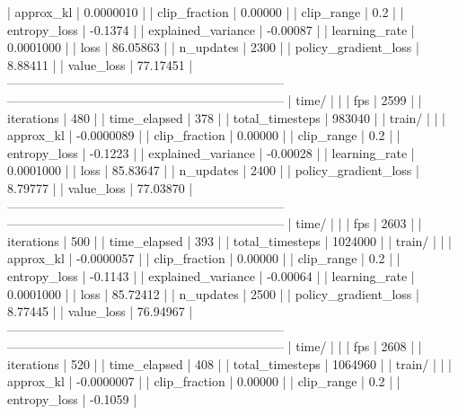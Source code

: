 |    approx_kl            |    0.0000010 |
|    clip_fraction        |      0.00000 |
|    clip_range           |          0.2 |
|    entropy_loss         |      -0.1374 |
|    explained_variance   |     -0.00087 |
|    learning_rate        |    0.0001000 |
|    loss                 |     86.05863 |
|    n_updates            |         2300 |
|    policy_gradient_loss |      8.88411 |
|    value_loss           |     77.17451 |
------------------------------------------------------------------
------------------------------------------------------------------
| time/                   |              |
|    fps                  |         2599 |
|    iterations           |          480 |
|    time_elapsed         |          378 |
|    total_timesteps      |       983040 |
| train/                  |              |
|    approx_kl            |   -0.0000089 |
|    clip_fraction        |      0.00000 |
|    clip_range           |          0.2 |
|    entropy_loss         |      -0.1223 |
|    explained_variance   |     -0.00028 |
|    learning_rate        |    0.0001000 |
|    loss                 |     85.83647 |
|    n_updates            |         2400 |
|    policy_gradient_loss |      8.79777 |
|    value_loss           |     77.03870 |
------------------------------------------------------------------
------------------------------------------------------------------
| time/                   |              |
|    fps                  |         2603 |
|    iterations           |          500 |
|    time_elapsed         |          393 |
|    total_timesteps      |      1024000 |
| train/                  |              |
|    approx_kl            |   -0.0000057 |
|    clip_fraction        |      0.00000 |
|    clip_range           |          0.2 |
|    entropy_loss         |      -0.1143 |
|    explained_variance   |     -0.00064 |
|    learning_rate        |    0.0001000 |
|    loss                 |     85.72412 |
|    n_updates            |         2500 |
|    policy_gradient_loss |      8.77445 |
|    value_loss           |     76.94967 |
------------------------------------------------------------------
------------------------------------------------------------------
| time/                   |              |
|    fps                  |         2608 |
|    iterations           |          520 |
|    time_elapsed         |          408 |
|    total_timesteps      |      1064960 |
| train/                  |              |
|    approx_kl            |   -0.0000007 |
|    clip_fraction        |      0.00000 |
|    clip_range           |          0.2 |
|    entropy_loss         |      -0.1059 |

